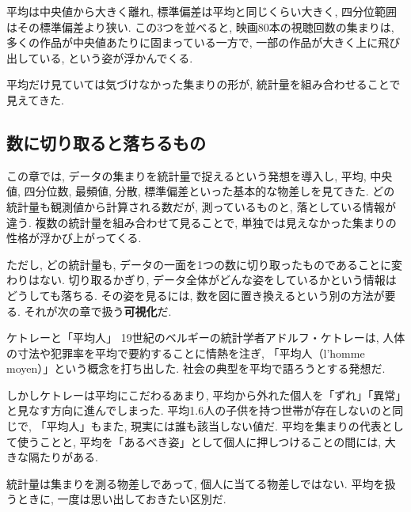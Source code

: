     平均は中央値から大きく離れ, 標準偏差は平均と同じくらい大きく, 四分位範囲はその標準偏差より狭い.
    この3つを並べると, 映画80本の視聴回数の集まりは, 多くの作品が中央値あたりに固まっている一方で, 一部の作品が大きく上に飛び出している, という姿が浮かんでくる.

    平均だけ見ていては気づけなかった集まりの形が, 統計量を組み合わせることで見えてきた.


  \subsection{数に切り取ると落ちるもの}

    この章では, データの集まりを統計量で捉えるという発想を導入し, 平均, 中央値, 四分位数, 最頻値, 分散, 標準偏差といった基本的な物差しを見てきた.
    どの統計量も観測値から計算される数だが, 測っているものと, 落としている情報が違う.
    複数の統計量を組み合わせて見ることで, 単独では見えなかった集まりの性格が浮かび上がってくる.

    ただし, どの統計量も, データの一面を1つの数に切り取ったものであることに変わりはない.
    切り取るかぎり, データ全体がどんな姿をしているかという情報はどうしても落ちる.
    その姿を見るには, 数を図に置き換えるという別の方法が要る.
    それが次の章で扱う\textbf{可視化}だ.

  \begin{mybox}{ケトレーと「平均人」}
    19世紀のベルギーの統計学者アドルフ・ケトレーは, 人体の寸法や犯罪率を平均で要約することに情熱を注ぎ, 「平均人（l'homme moyen）」という概念を打ち出した.\footnotemark
    社会の典型を平均で語ろうとする発想だ.

    しかしケトレーは平均にこだわるあまり, 平均から外れた個人を「ずれ」「異常」と見なす方向に進んでしまった.
    平均1.6人の子供を持つ世帯が存在しないのと同じで, 「平均人」もまた, 現実には誰も該当しない値だ.
    平均を集まりの代表として使うことと, 平均を「あるべき姿」として個人に押しつけることの間には, 大きな隔たりがある.

    統計量は集まりを測る物差しであって, 個人に当てる物差しではない.
    平均を扱うときに, 一度は思い出しておきたい区別だ.
  \end{mybox}
